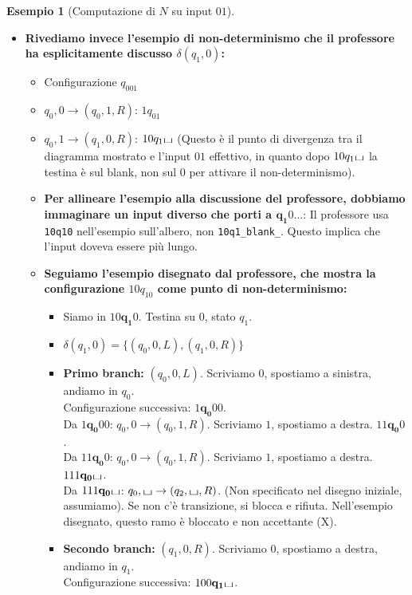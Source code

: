 \documentclass[a4paper]{article}
\theoremstyle{definition} %
\newtheorem{example}{Esempio}
\newcommand{\blankS}{\ensuremath{\raisebox{-0.15ex}{\scalebox{1.3}[0.7]{$\sqcup$}}}}
\begin{document}
\begin{example}[Computazione di $N$ su input $01$]
\begin{enumerate}
\begin{itemize}
        \item \textbf{Rivediamo invece l'esempio di non-determinismo che il professore ha esplicitamente discusso $\delta(q_1,0)$:}
        \begin{itemize}
            \item Configurazione $q_001$
            \item $q_0,0 \to (q_0,1,R)$: $1q_01$
            \item $q_0,1 \to (q_1,0,R)$: $10q_1\blankS$ (Questo è il punto di divergenza tra il diagramma mostrato e l'input $01$ effettivo, in quanto dopo $10q_1\blankS$ la testina è sul blank, non sul $0$ per attivare il non-determinismo).
            \item \textbf{Per allineare l'esempio alla discussione del professore, dobbiamo immaginare un input diverso che porti a $\mathbf{q_1}0...$}: Il professore usa \texttt{10q10} nell'esempio sull'albero, non \texttt{10q1\_blank\_}. Questo implica che l'input doveva essere più lungo.
            \item \textbf{Seguiamo l'esempio disegnato dal professore, che mostra la configurazione $10q_10$ come punto di non-determinismo:}
            \begin{itemize}
                \item Siamo in $10\mathbf{q_1}0$. Testina su $0$, stato $q_1$.
                \item $\delta(q_1, 0) = \{ (q_0, 0, L), (q_1, 0, R) \}$
                \item \textbf{Primo branch:} $(q_0, 0, L)$. Scriviamo $0$, spostiamo a sinistra, andiamo in $q_0$.\\
                Configurazione successiva: $1\mathbf{q_0}00$.\\
                Da $1\mathbf{q_0}00$: $q_0,0 \to (q_0,1,R)$. Scriviamo $1$, spostiamo a destra. $11\mathbf{q_0}0$.\\
                Da $11\mathbf{q_0}0$: $q_0,0 \to (q_0,1,R)$. Scriviamo $1$, spostiamo a destra. $111\mathbf{q_0}\blankS$.\\
                Da $111\mathbf{q_0}\blankS$: $q_0,\blankS \to (q_2,\blankS,R)$. (Non specificato nel disegno iniziale, assumiamo). Se non c'è transizione, si blocca e rifiuta. Nell'esempio disegnato, questo ramo è bloccato e non accettante (X).
                \item \textbf{Secondo branch:} $(q_1, 0, R)$. Scriviamo $0$, spostiamo a destra, andiamo in $q_1$.\\
                Configurazione successiva: $100\mathbf{q_1}\blankS$.\\

\end{itemize}
\end{itemize}
\end{itemize}
\end{enumerate}
\end{example}
\end{document}
